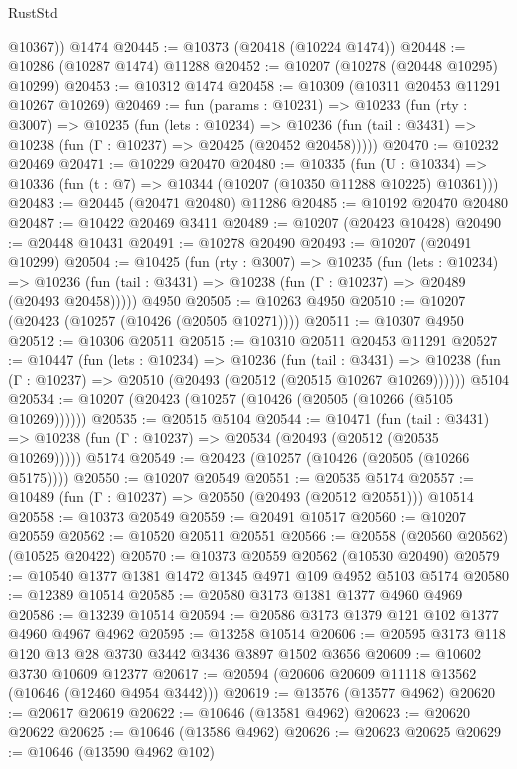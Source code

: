 \begin{lexlean}{RustStd}
\begin{coremodule}
        @10367))
    @1474
@20445 := @10373 (@20418 (@10224 @1474))
@20448 := @10286 (@10287 @1474) @11288
@20452 := @10207 (@10278 (@20448 @10295) @10299)
@20453 := @10312 @1474
@20458 := @10309 (@10311 @20453 @11291 @10267 @10269)
@20469 := fun (params : @10231) =>
  @10233
    (fun (rty : @3007) =>
    @10235
      (fun (lets : @10234) =>
      @10236 (fun (tail : @3431) => @10238 (fun (Γ : @10237) => @20425 (@20452 @20458)))))
@20470 := @10232 @20469
@20471 := @10229 @20470
@20480 := @10335
    (fun (U : @10334) => @10336 (fun (t : @7) => @10344 (@10207 (@10350 @11288 @10225) @10361)))
@20483 := @20445 (@20471 @20480) @11286
@20485 := @10192 @20470 @20480
@20487 := @10422 @20469 @3411
@20489 := @10207 (@20423 @10428)
@20490 := @20448 @10431
@20491 := @10278 @20490
@20493 := @10207 (@20491 @10299)
@20504 := @10425
    (fun (rty : @3007) =>
    @10235
      (fun (lets : @10234) =>
      @10236 (fun (tail : @3431) => @10238 (fun (Γ : @10237) => @20489 (@20493 @20458)))))
    @4950
@20505 := @10263 @4950
@20510 := @10207 (@20423 (@10257 (@10426 (@20505 @10271))))
@20511 := @10307 @4950
@20512 := @10306 @20511
@20515 := @10310 @20511 @20453 @11291
@20527 := @10447
    (fun (lets : @10234) =>
    @10236
      (fun (tail : @3431) =>
      @10238 (fun (Γ : @10237) => @20510 (@20493 (@20512 (@20515 @10267 @10269))))))
    @5104
@20534 := @10207 (@20423 (@10257 (@10426 (@20505 (@10266 (@5105 @10269))))))
@20535 := @20515 @5104
@20544 := @10471
    (fun (tail : @3431) => @10238 (fun (Γ : @10237) => @20534 (@20493 (@20512 (@20535 @10269)))))
    @5174
@20549 := @20423 (@10257 (@10426 (@20505 (@10266 @5175))))
@20550 := @10207 @20549
@20551 := @20535 @5174
@20557 := @10489 (fun (Γ : @10237) => @20550 (@20493 (@20512 @20551))) @10514
@20558 := @10373 @20549
@20559 := @20491 @10517
@20560 := @10207 @20559
@20562 := @10520 @20511 @20551
@20566 := @20558 (@20560 @20562) (@10525 @20422)
@20570 := @10373 @20559 @20562 (@10530 @20490)
@20579 := @10540 @1377 @1381 @1472 @1345 @4971 @109 @4952 @5103 @5174
@20580 := @12389 @10514
@20585 := @20580 @3173 @1381 @1377 @4960 @4969
@20586 := @13239 @10514
@20594 := @20586 @3173 @1379 @121 @102 @1377 @4960 @4967 @4962
@20595 := @13258 @10514
@20606 := @20595 @3173 @118 @120 @13 @28 @3730 @3442 @3436 @3897 @1502 @3656
@20609 := @10602 @3730 @10609 @12377
@20617 := @20594 (@20606 @20609 @11118 @13562 (@10646 (@12460 @4954 @3442)))
@20619 := @13576 (@13577 @4962)
@20620 := @20617 @20619
@20622 := @10646 (@13581 @4962)
@20623 := @20620 @20622
@20625 := @10646 (@13586 @4962)
@20626 := @20623 @20625
@20629 := @10646 (@13590 @4962 @102)

\end{coremodule}
\end{lexlean}
